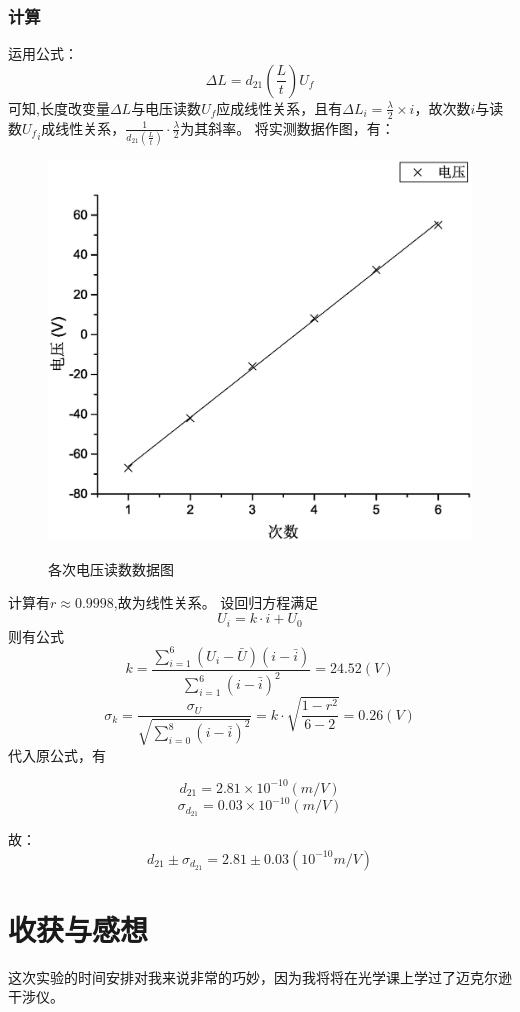 \documentclass{ctexart}
\begin{document}
    \subsubsection{计算}
    运用公式：
    $$\Delta L=d_{21} (\frac{L}t)U_f$$
    可知,长度改变量$\Delta L$与电压读数$U_f$应成线性关系，且有$\Delta L_i=\frac{\lambda}2\times i$，故次数$i$与读数${U_f}_i$成线性关系，$\frac{1}{d_{21} (\frac{L}t)}\cdot \frac{\lambda}2$为其斜率。
    将实测数据作图，有：
    \begin{figure}[H]
      \centering
      \caption{各次电压读数数据图}
      \includegraphics[width=\textwidth]{2}
      \label{fig:digit}
    \end{figure}
    计算有$r\approx0.9998$,故为线性关系。
    设回归方程满足$$U_i=k\cdot i+U_0$$
    则有公式$$k=\frac{\sum\limits_{i=1}^{6}{({U}_i-\bar{U})(i-\bar{i})}}{\sum\limits_{i=1}^{6}{(i-\bar{i})^2}}=24.52(V)$$
      $$\sigma_{k}=\frac{\sigma_{U}}{\sqrt{\sum\limits_{i=0}^{8}{(i-\bar i)^2}}}=k \cdot \sqrt{\frac{1-r^2}{6-2}}=0.26(V)$$
      代入原公式，有
      
      $$d_{21}=2.81\times10^{-10}(m/V)$$
      $$\sigma_{d_{21}}=0.03\times10^{-10}(m/V)$$

      故：$$d_{21}\pm\sigma_{d_{21}}=2.81\pm0.03(10^{-10}m/V)$$
      \section{收获与感想}
      这次实验的时间安排对我来说非常的巧妙，因为我将将在光学课上学过了迈克尔逊干涉仪。
\end{document}
